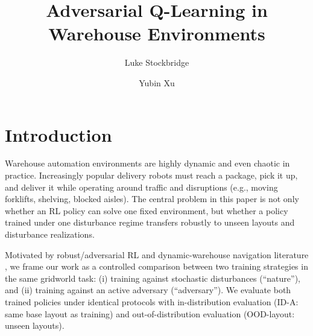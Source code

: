 \documentclass[sigconf]{aamas}
\title{Adversarial Q-Learning in Warehouse Environments}
\author{Luke Stockbridge}
\affiliation{
  \institution{Washington University}
  \city{St. Louis}
  \country{United States}}
\author{Yubin Xu}
\affiliation{
  \institution{Washington University}
  \city{St. Louis}
  \country{United States}}
\begin{document}

\pagestyle{fancy}
\fancyhead{}


\maketitle 


\section{Introduction}

Warehouse automation environments are highly dynamic and even chaotic in practice. Increasingly popular delivery robots must reach a package, pick it up, and deliver it while operating around traffic and disruptions (e.g., moving forklifts, shelving, blocked aisles). The central problem in this paper is not only whether an RL policy can solve one fixed environment, but whether a policy trained under one disturbance regime transfers robustly to unseen layouts and disturbance realizations.

Motivated by robust/adversarial RL and dynamic-warehouse navigation literature \cite{pinto2017rarl,tessler2019actionrobust,kristiansson2025warehouse}, we frame our work as a controlled comparison between two training strategies in the same gridworld task: (i) training against stochastic disturbances (``nature''), and (ii) training against an active adversary (``adversary''). We evaluate both trained policies under identical protocols with in-distribution evaluation (ID-A: same base layout as training) and out-of-distribution evaluation (OOD-layout: unseen layouts).
\end{document}
